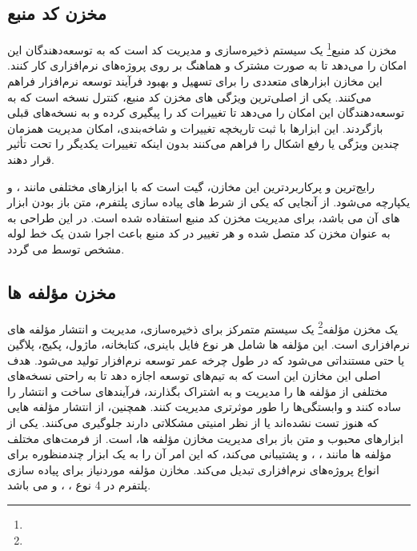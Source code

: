 \subsection{مخزن کد منبع}

مخزن کد منبع\footnote{} یک سیستم ذخیره‌سازی و مدیریت کد است که به توسعه‌دهندگان این امکان را می‌دهد تا به صورت مشترک و هماهنگ بر روی پروژه‌های نرم‌افزاری کار کنند. این مخازن ابزارهای متعددی را برای تسهیل و بهبود فرآیند توسعه نرم‌افزار فراهم می‌کنند. یکی از اصلی‌ترین ویژگی های مخزن کد منبع، کنترل نسخه است که به توسعه‌دهندگان این امکان را می‌دهد تا تغییرات کد را پیگیری کرده و به نسخه‌های قبلی بازگردند. این ابزارها با ثبت تاریخچه تغییرات و شاخه‌بندی، امکان مدیریت همزمان چندین ویژگی یا رفع اشکال را فراهم می‌کنند بدون اینکه تغییرات یکدیگر را تحت تأثیر قرار دهند.

رایج‌ترین و پرکاربردترین این مخازن، گیت است که با ابزارهای مختلفی مانند ،  و  یکپارچه می‌شود. از آنجایی که یکی از شرط های پیاده سازی پلتفرم، متن باز بودن ابزار های آن می باشد،  برای مدیریت مخزن کد منبع استفاده شده است. در این طراحی  به  به عنوان مخزن کد متصل شده و هر تغییر در کد منبع باعث اجرا شدن یک خط لوله  مشخص توسط  می گردد.

\subsection{مخزن مؤلفه ها}
یک مخزن مؤلفه\footnote{} یک سیستم متمرکز برای ذخیره‌سازی، مدیریت و انتشار مؤلفه های نرم‌افزاری است. این مؤلفه ها شامل هر نوع فایل باینری، کتابخانه، ماژول، پکیج، پلاگین یا حتی مستنداتی می‌شود که در طول چرخه عمر توسعه نرم‌افزار تولید می‌شود. هدف اصلی این مخازن این است که به تیم‌های توسعه اجازه دهد تا به راحتی نسخه‌های مختلفی از مؤلفه ها را مدیریت و به اشتراک بگذارند، فرآیندهای ساخت و انتشار را ساده کنند و وابستگی‌ها را طور موثرتری مدیریت کنند. همچنین، از انتشار مؤلفه هایی که هنوز تست نشده‌اند یا از نظر امنیتی مشکلاتی دارند جلوگیری می‌کنند. 
یکی از ابزارهای محبوب و متن باز برای مدیریت مخازن مؤلفه ها،  است.  از فرمت‌های مختلف مؤلفه ها مانند ، ،  و  پشتیبانی می‌کند، که این امر آن را به یک ابزار چندمنظوره برای انواع پروژه‌های نرم‌افزاری تبدیل می‌کند. مخازن مؤلفه موردنیاز برای پیاده سازی پلتفرم در 4 نوع ، ،  و  می باشد.

